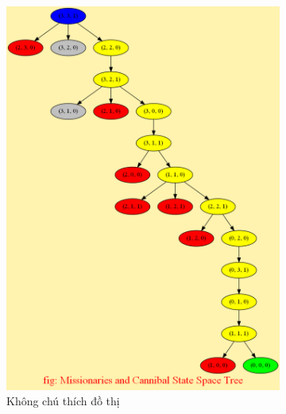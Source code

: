 \documentclass[a4paper, 11pt]{article}
\begin{document}
\begin{figure}
    \begin{subfigure}[b]{0.5\textwidth}
        \centering
        \includegraphics[width=\textwidth]{dfs.png}
        \caption{Không chú thích đồ thị}
    \end{subfigure}
    \hfill
    \begin{subfigure}[b]{0.5\textwidth}
        \centering

\end{subfigure}
\end{figure}
\end{document}
